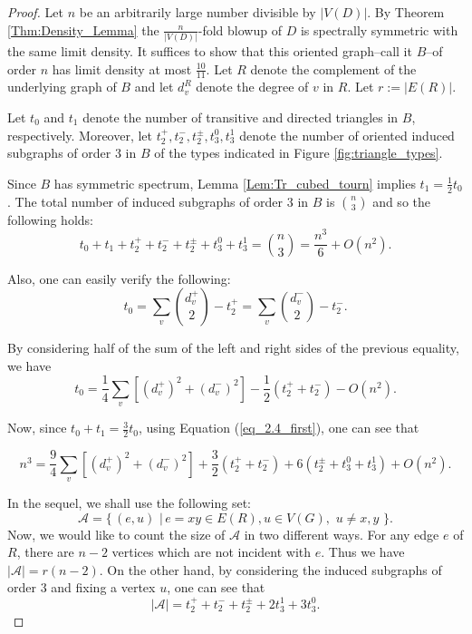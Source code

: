 \documentclass[11pt]{article}
\theoremstyle{plain}
\newcommand{\ssym}[0]{spectrally symmetric }
\begin{document}
\begin{proof}
Let $n$ be an arbitrarily large number divisible by $|V(D)|$. By Theorem \ref{Thm:Density_Lemma} the $\frac{n}{|V(D)|}$-fold blowup of $D$ is \ssym with the same limit density. It suffices to show that this oriented graph--call it $B$--of order $n$ has limit density at most $\frac{10}{11}$. Let $R$ denote the complement of the underlying graph of $B$ and let $d_v^R$ denote the degree of $v$ in $R$. Let $r:=|E(R)|$.


    
Let $t_0$ and $t_1$ denote the number of transitive and directed triangles in $B$, respectively. Moreover, let $t^{+}_2, t^-_2, t^{\pm}_2, t^0_3, t^1_3$ denote the number of oriented induced subgraphs of order 3 in $B$ of the types indicated in Figure \ref{fig:triangle_types}. 

 
Since $B$ has symmetric spectrum, Lemma \ref{Lem:Tr_cubed_tourn} implies $t_1=\frac{1}{2}t_0$. The total number of induced subgraphs of order 3 in $B$ is $ \binom{n}{3}$ and so the following holds: \begin{equation} \label{eq_2.4_first}
    t_0+  t_1+t^{+}_2+ t^-_2+t^{\pm}_2+t^0_3+ t^1_3=  \binom{n}{3}= \frac{n^3}{6}+O(n^2).
\end{equation}

Also, one can easily verify the following: $$t_0=  \sum_v  \binom{d^+_v}{2}- t^+_2= \sum_v \binom{d^-_v}{2}- t^-_2.$$

By considering  half of the sum of  the left and  right sides of the previous equality, we have  $$t_0=\frac{1}{4}\sum_v [(d^+_v)^2 + (d^-_v)^2]-\frac{1}{2} (t^+_2 +  t^-_2)-O(n^2).$$

Now, since $t_0+t_1=\frac{3}{2}t_0$, using Equation (\ref{eq_2.4_first}), one can see that 

\begin{equation}\label{eq_2.4_second}
n^3= \frac{9}{4}\sum_v [(d^+_v)^2 + (d^-_v)^2]+\frac{3}{2} (t^+_2 + t^- _2) +6 (t^{\pm}_2+ t^0 _3+t^1 _3)+O(n^2).
\end{equation}

In the sequel, we shall use the following set:  $$\mathcal{A} =\{ \, (e, u) \,\, |\, e=xy \in E(R), u\in V(G), \,\,  u\neq x, y \,\,\}.$$ Now, we would like to count the size of $\mathcal{A}$ in two different ways. For any edge $e$ of $R$, there are $n-2$ vertices which are not incident with $e$. Thus we have  $|\mathcal{A}|=r(n-2)$. On the other hand, by considering the induced subgraphs of order $3$ and fixing a vertex $u$,  one can see that $$|\mathcal{A}|=t^{+}_2+ t^-_2+t^{\pm}_2+ 2t^1_3 + 3 t^0_3.$$


\end{proof}
\end{document}
